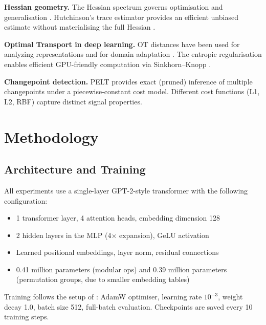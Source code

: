 \documentclass[12pt,twoside]{article}
\begin{document}
\textbf{Hessian geometry.}
The Hessian spectrum governs optimisation and generalisation
\citep{keskar2016large, sagun2017empirical, jastrzebski2018three}. Hutchinson's
trace estimator \citep{hutchinson1990stochastic} provides an efficient unbiased
estimate without materialising the full Hessian
\citep{dangel2020backpack, yao2020hessian}.

\textbf{Optimal Transport in deep learning.}
OT distances have been used for analyzing representations
\citep{morcos2018insights, kornblith2019similarity} and for domain adaptation
\citep{courty2017optimal}. The entropic regularisation
\citep{cuturi2013sinkhorn} enables efficient GPU-friendly computation via
Sinkhorn--Knopp \citep{sinkhorn1964concerning}.

\textbf{Changepoint detection.}
PELT \citep{killick2012optimal} provides exact (pruned) inference of
multiple changepoints under a piecewise-constant cost model. Different cost
functions (L1, L2, RBF) capture distinct signal properties.

\section{Methodology}
\label{sec:methods}

\subsection{Architecture and Training}

All experiments use a single-layer GPT-2-style transformer
\citep{radford2019language} with the following configuration:

\begin{itemize}
  \item 1 transformer layer, 4 attention heads, embedding dimension 128
  \item 2 hidden layers in the MLP (4$\times$ expansion), GeLU activation
  \item Learned positional embeddings, layer norm, residual connections
  \item 0.41 million parameters (modular ops) and 0.39 million parameters
    (permutation groups, due to smaller embedding tables)
\end{itemize}

Training follows the setup of \citet{nanda2022progress}: AdamW optimiser,
learning rate \(10^{-3}\), weight decay 1.0, batch size 512, full-batch
evaluation. Checkpoints are saved every 10 training steps.
\end{document}
